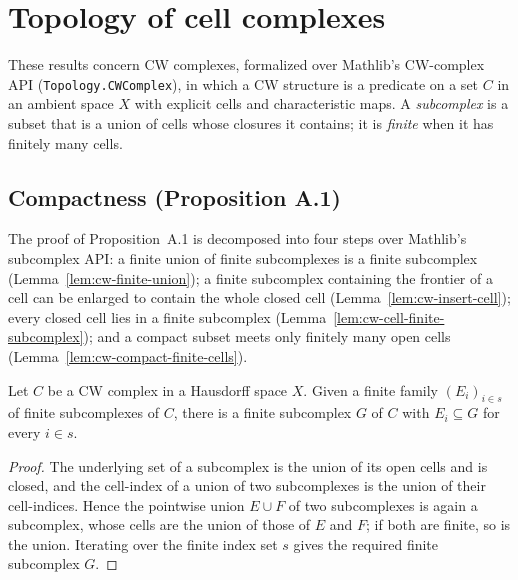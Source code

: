 


\section{Topology of cell complexes}

These results concern CW complexes, formalized over Mathlib's CW-complex API
(\texttt{Topology.CWComplex}), in which a CW structure is a predicate on a set
$C$ in an ambient space $X$ with explicit cells and characteristic maps. A
\emph{subcomplex} is a subset that is a union of cells whose closures it
contains; it is \emph{finite} when it has finitely many cells.

\subsection{Compactness (Proposition A.1)}

The proof of Proposition~A.1 is decomposed into four steps over Mathlib's
subcomplex API: a finite union of finite subcomplexes is a finite subcomplex
(Lemma~\ref{lem:cw-finite-union}); a finite subcomplex containing the frontier
of a cell can be enlarged to contain the whole closed cell
(Lemma~\ref{lem:cw-insert-cell}); every closed cell lies in a finite subcomplex
(Lemma~\ref{lem:cw-cell-finite-subcomplex}); and a compact subset meets only
finitely many open cells (Lemma~\ref{lem:cw-compact-finite-cells}).

\begin{lemma}
    \label{lem:cw-finite-union}
    \leanok
    Let $C$ be a CW complex in a Hausdorff space $X$. Given a finite family
    $(E_i)_{i \in s}$ of finite subcomplexes of $C$, there is a finite
    subcomplex $G$ of $C$ with $E_i \subseteq G$ for every $i \in s$.
\end{lemma}
\begin{proof}
    The underlying set of a subcomplex is the union of its open cells and is
    closed, and the cell-index of a union of two subcomplexes is the union of
    their cell-indices. Hence the pointwise union $E \cup F$ of two subcomplexes
    is again a subcomplex, whose cells are the union of those of $E$ and $F$; if
    both are finite, so is the union. Iterating over the finite index set $s$
    gives the required finite subcomplex $G$.
\end{proof}


